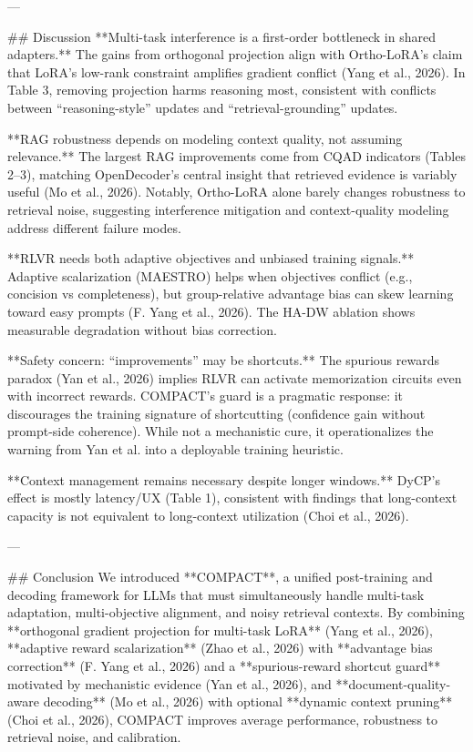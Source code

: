 ---

## Discussion  
**Multi-task interference is a first-order bottleneck in shared adapters.** The gains from orthogonal projection align with Ortho-LoRA’s claim that LoRA’s low-rank constraint amplifies gradient conflict (Yang et al., 2026). In Table 3, removing projection harms reasoning most, consistent with conflicts between “reasoning-style” updates and “retrieval-grounding” updates.

**RAG robustness depends on modeling context quality, not assuming relevance.** The largest RAG improvements come from CQAD indicators (Tables 2–3), matching OpenDecoder’s central insight that retrieved evidence is variably useful (Mo et al., 2026). Notably, Ortho-LoRA alone barely changes robustness to retrieval noise, suggesting interference mitigation and context-quality modeling address different failure modes.

**RLVR needs both adaptive objectives and unbiased training signals.** Adaptive scalarization (MAESTRO) helps when objectives conflict (e.g., concision vs completeness), but group-relative advantage bias can skew learning toward easy prompts (F. Yang et al., 2026). The HA-DW ablation shows measurable degradation without bias correction.

**Safety concern: “improvements” may be shortcuts.** The spurious rewards paradox (Yan et al., 2026) implies RLVR can activate memorization circuits even with incorrect rewards. COMPACT’s guard is a pragmatic response: it discourages the training signature of shortcutting (confidence gain without prompt-side coherence). While not a mechanistic cure, it operationalizes the warning from Yan et al. into a deployable training heuristic.

**Context management remains necessary despite longer windows.** DyCP’s effect is mostly latency/UX (Table 1), consistent with findings that long-context capacity is not equivalent to long-context utilization (Choi et al., 2026).

---

## Conclusion  
We introduced **COMPACT**, a unified post-training and decoding framework for LLMs that must simultaneously handle multi-task adaptation, multi-objective alignment, and noisy retrieval contexts. By combining **orthogonal gradient projection for multi-task LoRA** (Yang et al., 2026), **adaptive reward scalarization** (Zhao et al., 2026) with **advantage bias correction** (F. Yang et al., 2026) and a **spurious-reward shortcut guard** motivated by mechanistic evidence (Yan et al., 2026), and **document-quality-aware decoding** (Mo et al., 2026) with optional **dynamic context pruning** (Choi et al., 2026), COMPACT improves average performance, robustness to retrieval noise, and calibration.

